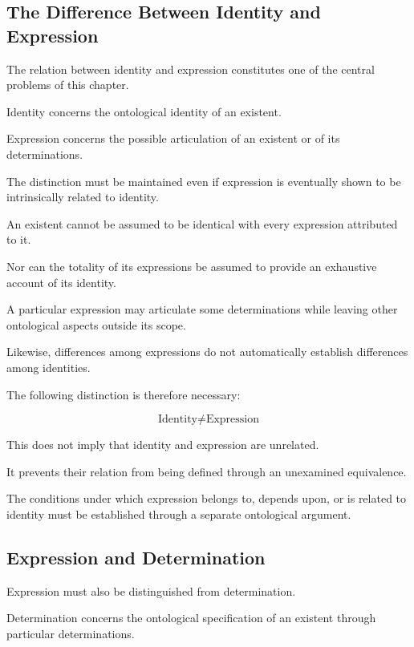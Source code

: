 \subsection{The Difference Between Identity and Expression}

The relation between identity and expression
constitutes one of the central problems
of this chapter.

Identity concerns the ontological identity
of an existent.

Expression concerns the possible articulation
of an existent or of its determinations.

The distinction must be maintained even
if expression is eventually shown to be
intrinsically related to identity.

An existent cannot be assumed to be identical
with every expression attributed to it.

Nor can the totality of its expressions
be assumed to provide an exhaustive
account of its identity.

A particular expression may articulate
some determinations while leaving other
ontological aspects outside its scope.

Likewise, differences among expressions
do not automatically establish differences
among identities.

The following distinction is therefore
necessary:

\[
\text{Identity}
\neq
\text{Expression}
\]

This does not imply that identity and
expression are unrelated.

It prevents their relation from being
defined through an unexamined equivalence.

The conditions under which expression
belongs to, depends upon, or is related
to identity must be established through
a separate ontological argument.

\subsection{Expression and Determination}

Expression must also be distinguished
from determination.

Determination concerns the ontological
specification of an existent through
particular determinations.


